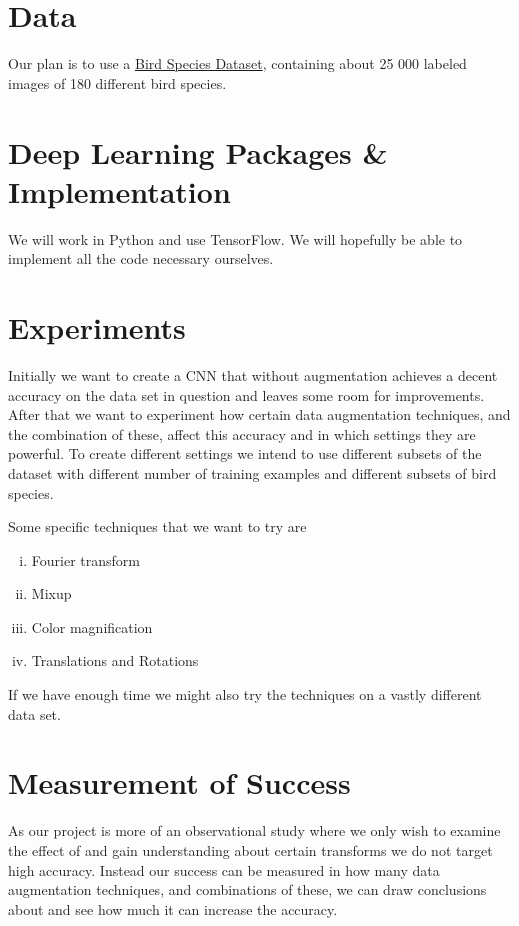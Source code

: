 \documentclass{article}
\begin{document}
\section{Data}

Our plan is to use a \href{https://www.kaggle.com/gpiosenka/100-bird-species}{Bird Species Dataset}, containing about 25 000 labeled images of 180 different bird species. 

\section{Deep Learning Packages \& Implementation}

We will work in Python and use TensorFlow. We will hopefully be able to implement all the code necessary ourselves.

\section{Experiments}

Initially we want to create a CNN that without augmentation achieves a decent accuracy on the data set in question and leaves some room for improvements. After that we want to experiment how certain data augmentation techniques, and the combination of these, affect this accuracy and in which settings they are powerful. To create different settings we intend to use different subsets of the dataset with different number of training examples and different subsets of bird species.

Some specific techniques that we want to try are

\begin{enumerate}[(i)]
 \item Fourier transform
 \item Mixup
 \item Color magnification 
 \item Translations and Rotations
\end{enumerate}

If we have enough time we might also try the techniques on a vastly different data set.

\section{Measurement of Success}

As our project is more of an observational study where we only wish to examine the effect of and gain 
understanding about certain transforms we do not target high accuracy. 
Instead our success can be measured in how many data augmentation techniques, and 
combinations of these, we can draw conclusions about and see how much it can increase the accuracy.
\end{document}
